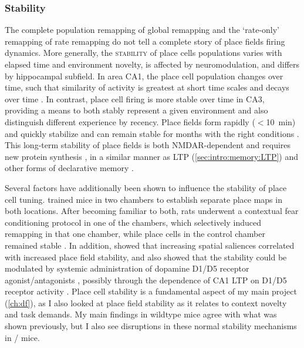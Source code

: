 \subsubsection{Stability}
\label{sec:intro:memory:stability}
The complete population remapping of global remapping and the `rate-only' remapping of rate remapping do not tell a complete story of place fields firing dynamics.
More generally, the \textsc{stability} of place cells populations varies with elapsed time and environment novelty, is affected by neuromodulation, and differs by hippocampal subfield.
In area CA1, the place cell population changes over time, such that similarity of activity is greatest at short time scales and decays over time \citep{Mankin2012}.
In contrast, place cell firing is more stable over time in CA3, providing a means to both stably represent a given environment and also distinguish different experience by recency.
Place fields form rapidly ($<$10~min) and quickly stabilize \citep{Frank2004} and can remain stable for months with the right conditions \citep{Thompson1990, Lever2002a, Ziv2013}.
This long-term stability of place fields is both \ac{NMDAR}-dependent \citep{McHugh1996, Kentros1998} and requires new protein synthesis \citep{Agnihotri2004}, in a similar manner as LTP (\autoref{sec:intro:memory:LTP}) and other forms of declarative memory \citep{Hernandez2008}.

Several factors have additionally been shown to influence the stability of place cell tuning.
\citeauthor{Moita2004} trained mice in two chambers to establish separate place maps in both locations.
After becoming familiar to both, rats underwent a contextual fear conditioning protocol in one of the chambers, which selectively induced remapping in that one chamber, while place cells in the control chamber remained stable \citep{Moita2004}.
In addition, \citeauthor{Kentros2004} showed that increasing spatial saliences correlated with increased place field stability, and also showed that the stability could be modulated by systemic administration of dopamine D1/D5 receptor agonist/antagonists \citep{Kentros2004}, possibly through the dependence of CA1 LTP on D1/D5 receptor activity \citep{Huang1995}.
Place cell stability is a fundamental aspect of my main project (\autoref{ch:df}), as I also looked at place field stability as it relates to context novelty and task demands.
My main findings in wildtype mice agree with what was shown previously, but I also see disruptions in these normal stability mechanisms in \df/ mice.

